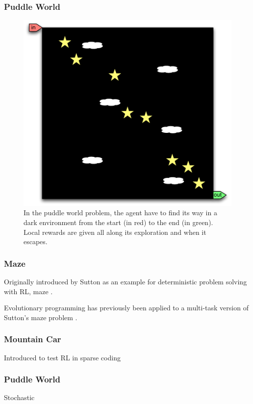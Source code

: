 \subsubsection{Puddle World}
\begin{figure}[h]
\center
\includegraphics[width=0.75\linewidth]{PW_problem.pdf}
\caption{In the puddle world problem, the agent have to find its way in a dark environment from the start (in red) to the end (in green). Local rewards are given all along its exploration and when it escapes.}\label{fig:MC:problem}
\end{figure}

\subsubsection{Maze}

Originally introduced by Sutton as an example for deterministic problem solving with RL, maze \cite{Sutton1990}.

Evolutionary programming has previously been applied to a multi-task version of Sutton's maze problem \cite{Handa2007}.

\subsubsection{Mountain Car}

Introduced to test RL in sparse coding \cite{sutton1996generalization}

\subsubsection{Puddle World}

Stochastic

